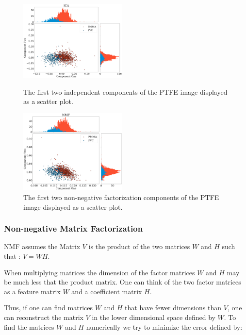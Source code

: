 \documentclass[a4paper,11pt]{article}
\begin{document}
\begin{figure}
  \begin{center}
    \includegraphics[width=0.48\textwidth]{figures/ICAnone.png}
  \end{center}
  
  \caption{The first two independent components of the PTFE image displayed as a scatter plot.}
  
  \label{ICA}  
  \begin{center}
    \includegraphics[width=0.48\textwidth]{figures/NMFnone.png}
  \end{center}
  
  \caption{The first two non-negative factorization components of the PTFE image displayed as a scatter plot.}
  
  \label{NMF}
\end{figure}

\subsubsection{Non-negative Matrix Factorization}

NMF assumes the Matrix $V$ is the product of the two matrices $W$ and $H$ such that : $V = WH$. 

When multiplying matrices the dimension of the factor matrices $W$ and $H$ may be much less that the product matrix. One can think of the two factor matrices as a feature matrix $W$ and a coefficient matrix $H$.

Thus, if one can find matrices $W$ and $H$ that have fewer dimensions than $V$, one can reconstruct the matrix $V$ in the lower dimensional space defined by $W$. To find the matrices $W$ and $H$ numerically we try to minimize the error defined by:
\end{document}
